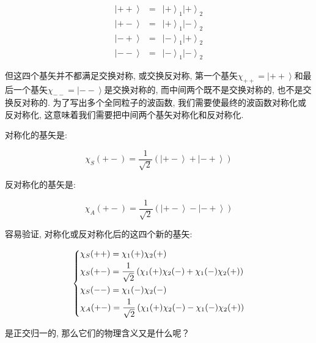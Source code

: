 \begin{eqnarray*}
  \left| {++}
\right\rangle &=& \left| {+} \right\rangle_1 \left| {+}
\right\rangle_2 \\
  \left| {+-}
\right\rangle &=& \left| {+} \right\rangle_1 \left| {-}
\right\rangle_2 \\
  \left| {-+}
\right\rangle &=& \left| {-} \right\rangle_1 \left| {+}
\right\rangle_2\\
  \left| {--}
\right\rangle &=& \left| {-} \right\rangle_1 \left| {-}
\right\rangle_2
\end{eqnarray*}

但这四个基矢并不都满足交换对称, 或交换反对称, 第一个基矢$\chi_{++} =
\left| {++} \right\rangle$和最后一个基矢$\chi_{--} = \left| {--}
\right\rangle$是交换对称的, 而中间两个既不是交换对称的,
也不是交换反对称的. 为了写出多个全同粒子的波函数,
我们需要使最终的波函数对称化或反对称化,
这意味着我们需要把中间两个基矢对称化和反对称化.

对称化的基矢是:

\begin{equation*}
\chi_S(+-) = \frac{1}{\sqrt 2} \left( \left| {+-} \right\rangle +
\left| {-+} \right\rangle \right)
\end{equation*}

反对称化的基矢是:

\begin{equation*}
\chi_A(+-) = \frac{1}{\sqrt 2} \left( \left| {+-} \right\rangle -
\left| {-+} \right\rangle \right)
\end{equation*}

容易验证, 对称化或反对称化后的这四个新的基矢:

\begin{equation}\label{spin singlet triplet representation}
\left\{ \begin{gathered}
  \chi_S(++) = \chi_1(+)\chi_2(+) \hfill \\
  \chi_S(+-) = \frac{1}{\sqrt 2} \left( \chi_1(+) \chi_2(-) + \chi_1(-) \chi_2(+) \right) \hfill \\
  \chi_S(--) = \chi_1(-)\chi_2(-) \hfill \\
  \chi_A(+-) = \frac{1}{\sqrt 2} \left( \chi_1(+) \chi_2(-) - \chi_1(-) \chi_2(+) \right) \hfill \\
\end{gathered}  \right.
\end{equation}

是正交归一的, 那么它们的物理含义又是什么呢？

